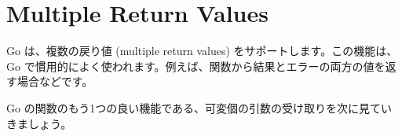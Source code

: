 \section{Multiple Return Values}

Go は、複数の戻り値 (multiple return values) をサポートします。この機能は、Go で慣用的によく使われます。例えば、関数から結果とエラーの両方の値を返す場合などです。




Go の関数のもう1つの良い機能である、可変個の引数の受け取りを次に見ていきましょう。